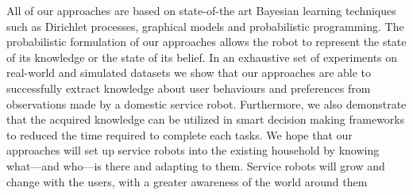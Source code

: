 \documentclass[11pt]{book}
\begin{document}
All of our approaches are based on state-of-the art Bayesian learning techniques such as Dirichlet processes, graphical models and probabilistic programming. The probabilistic formulation of our approaches allows the robot to represent the state of its knowledge or the state of its belief. In an exhaustive set of experiments on real-world and simulated datasets we show that our approaches are able to successfully extract knowledge about user behaviours and preferences from observations made by a domestic service robot. Furthermore, we also demonstrate that the acquired knowledge can be utilized in smart decision making frameworks to reduced the time required to complete each tasks. We hope that our approaches will set up service robots into the existing household by knowing what—and who—is there and adapting to them. Service robots will grow and change with the users, with a greater awareness of the world around them
\end{document}
